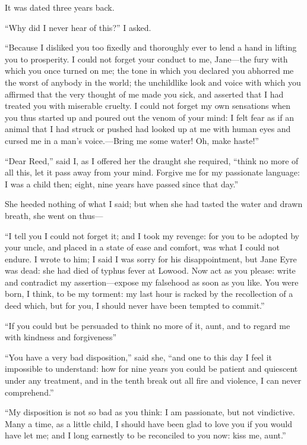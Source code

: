 It was dated three years back.

\enquote{Why did I never hear of this?} I asked.

\enquote{Because I disliked you too fixedly and thoroughly ever to lend
	a hand in lifting you to prosperity. I could not forget your conduct to
	me, Jane---the fury with which you once turned on me; the tone in which
	you declared you abhorred me the worst of anybody in the world; the
	unchildlike look and voice with which you affirmed that the very thought
	of me made you sick, and asserted that I had treated you with miserable
	cruelty. I could not forget my own sensations when you thus started up
	and poured out the venom of your mind: I felt fear as if an animal that
	I had struck or pushed had looked up at me with human eyes and cursed me
	in a man's voice.---Bring me some water! Oh, make haste!}

\enquote{Dear \Mrs{} Reed,} said I, as I offered her the draught she
required, \enquote{think no more of all this, let it pass away from your
	mind. Forgive me for my passionate language: I was a child then; eight,
	nine years have passed since that day.}

She heeded nothing of what I said; but when she had tasted the water and
drawn breath, she went on thus---

\enquote{I tell you I could not forget it; and I took my revenge: for
	you to be adopted by your uncle, and placed in a state of ease and
	comfort, was what I could not endure. I wrote to him; I said I was
	sorry for his disappointment, but Jane Eyre was dead: she had died of
	typhus fever at Lowood. Now act as you please: write and contradict my
	assertion---expose my falsehood as soon as you like. You were born, I
	think, to be my torment: my last hour is racked by the recollection of a
	deed which, but for you, I should never have been tempted to commit.}

\enquote{If you could but be persuaded to think no more of it, aunt, and
	to regard me with kindness and forgiveness}

\enquote{You have a very bad disposition,} said she, \enquote{and one to
	this day I feel it impossible to understand: how for nine years you
	could be patient and quiescent under any treatment, and in the tenth
	break out all fire and violence, I can never comprehend.}

\enquote{My disposition is not so bad as you think: I am passionate, but
	not vindictive. Many a time, as a little child, I should have been glad
	to love you if you would have let me; and I long earnestly to be
	reconciled to you now: kiss me, aunt.}

